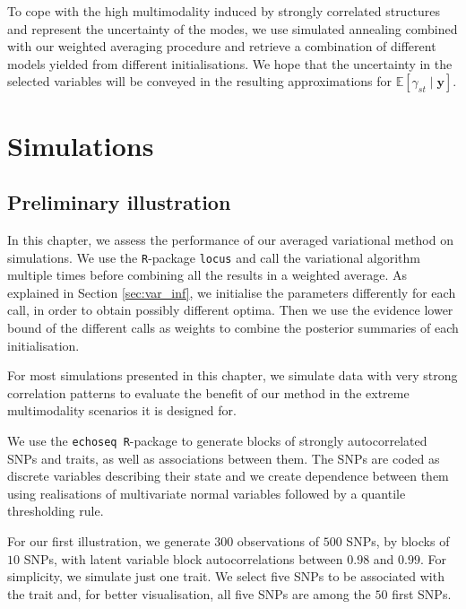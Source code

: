 \documentclass[a4paper, 11pt]{report}
\numberwithin{equation}{chapter}
\begin{document}
To cope with the high multimodality induced by strongly correlated structures and represent the uncertainty of the modes, we use simulated annealing combined with our weighted averaging procedure and retrieve a combination of different models yielded from different initialisations. We hope that the uncertainty in the selected variables will be conveyed in the resulting approximations for $\mathbb{E}\left[\gamma_{st}\mid \boldsymbol{y}\right]$.

\newpage
\chapter{Simulations} \label{chap:sim}
\section{Preliminary illustration}
In this chapter, we assess the performance of our averaged variational method on simulations. We use the \texttt{R}-package \texttt{locus} \citep{r_locus} and call the variational algorithm multiple times before combining all the results in a weighted average. As explained in Section \ref{sec:var_inf}, we initialise the parameters differently for each call, in order to obtain possibly different optima. Then we use the evidence lower bound of the different calls as weights to combine the posterior summaries of each initialisation. 

For most simulations presented in this chapter, we simulate data with very strong correlation patterns to evaluate the benefit of our method in the extreme multimodality scenarios it is designed for.

We use the \texttt{echoseq R}-package \citep{r_echoseq} to generate blocks of strongly autocorrelated SNPs and traits, as well as associations between them. The SNPs are coded as discrete variables describing their state and we create dependence between them using realisations of multivariate normal variables followed by a quantile thresholding rule.

For our first illustration, we generate $300$ observations of $500$ SNPs, by blocks of $10$ SNPs, with latent variable block autocorrelations between $0.98$ and $0.99$. For simplicity, we simulate just one trait. We select five SNPs to be associated with the trait and, for better visualisation, all five SNPs are among the $50$ first SNPs.
\end{document}

